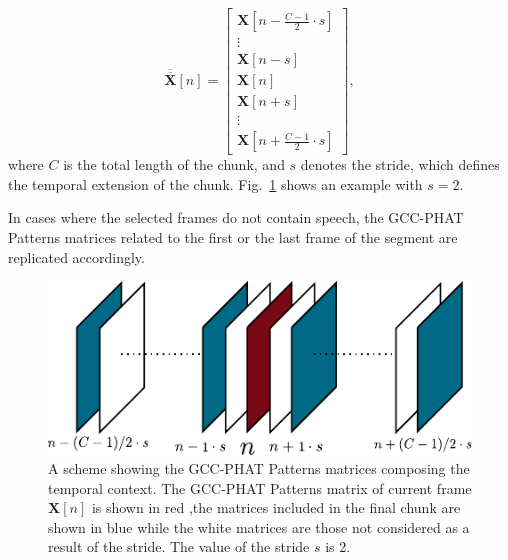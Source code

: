 \documentclass[review]{elsarticle}
\newcommand{\figref}[1]{Fig.~\ref{#1}}
\begin{document}
\begin{equation}
\overline{\overline{\mathbf{X}}}[n]= \left [ \begin{array}{c} 
\mathbf{X}[n -  \frac{C-1}{2} \cdot s]\\
\vdots\\
\mathbf{X}[n - s]\\
\mathbf{X}[n]\\
\mathbf{X}[n+s]\\
\vdots\\
\mathbf{X}[n + \frac{C-1}{2} \cdot s]
\end{array}
\right ],
\end{equation}
where $C$ is the total length of the chunk, and $s$ denotes the stride, which defines the temporal extension of the chunk. \figref{fig:cxt_str} shows an example with $s=2$.

In cases where the selected frames do not contain speech, the GCC-PHAT Patterns matrices related to the first or the last frame of the segment are replicated accordingly.

\begin{figure}[h] 
	\centering
	\includegraphics[width=0.65\columnwidth]{imgs/cxt_str}
	\caption{A scheme showing the GCC-PHAT Patterns matrices composing the temporal context. The GCC-PHAT Patterns matrix of current frame $\mathbf{X}[n]$ is shown in red ,the matrices included in the final chunk are shown in blue while the white matrices are those not considered as a result of the stride. The value of the stride $s$ is 2.}
	\label{fig:cxt_str}
\end{figure} 
\end{document}
